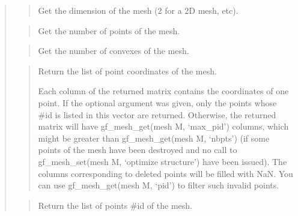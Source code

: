\documentclass[a4paper,11pt,english]{sphinxmanual}
\begin{document}
\sphinxAtStartPar
{}
\begin{quote}

\sphinxAtStartPar
{}
\begin{quote}

\sphinxAtStartPar
Get the dimension of the mesh (2 for a 2D mesh, etc).
\end{quote}

\sphinxAtStartPar
{}
\begin{quote}

\sphinxAtStartPar
Get the number of points of the mesh.
\end{quote}

\sphinxAtStartPar
{}
\begin{quote}

\sphinxAtStartPar
Get the number of convexes of the mesh.
\end{quote}

\sphinxAtStartPar
{}
\begin{quote}

\sphinxAtStartPar
Return the list of point coordinates of the mesh.

\sphinxAtStartPar
Each column of the returned matrix contains the coordinates of one
point. If the optional argument  was given, only the points
whose \#id is listed in this vector are returned. Otherwise, the
returned matrix will have gf\_mesh\_get(mesh M, ‘max\_pid’) columns, which might
be greater than gf\_mesh\_get(mesh M, ‘nbpts’) (if some points of the mesh have
been destroyed and no call to gf\_mesh\_set(mesh M, ‘optimize structure’) have
been issued). The columns corresponding to deleted points will be
filled with NaN. You can use gf\_mesh\_get(mesh M, ‘pid’) to filter such invalid
points.
\end{quote}

\sphinxAtStartPar
{}
\begin{quote}

\sphinxAtStartPar
Return the list of points \#id of the mesh.


\end{quote}
\end{quote}
\end{document}
